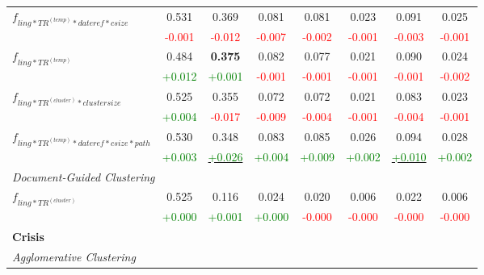 \documentclass[a4paper,BCOR=10mm]{report}
\numberwithin{lemma}{chapter}
\numberwithin{definition}{chapter}
\begin{document}
\begin{table}
\begin{centering}
{\begin{tabular}{|l|ccccccc|}
\multirow{2}{*}{$f_{ ling*TR^{(temp)}*\mathit{dateref}*\mathit{csize} }$}   & 0.531 & 0.369 & 0.081 & 0.081 & 0.023 & 0.091 & 0.025 \\
    & \small \textcolor{red}{-0.001}    & \small \textcolor{red}{-0.012}    & \small \textcolor{red}{-0.007}    & \small \textcolor{red}{-0.002}    & \small \textcolor{red}{-0.001}    & \small \textcolor{red}{-0.003}    & \small \textcolor{red}{-0.001} \\\hline
\multirow{2}{*}{$f_{ ling*TR^{(temp)} }$}   & 0.484 & \textbf{ 0.375 }  & 0.082 & 0.077 & 0.021 & 0.090 & 0.024 \\
    & \small \textcolor{green}{+0.012}  & \small \textcolor{green}{+0.001}  & \small \textcolor{red}{-0.001}    & \small \textcolor{red}{-0.001}    & \small \textcolor{red}{-0.001}    & \small \textcolor{red}{-0.001}    & \small \textcolor{red}{-0.002} \\\hline
\multirow{2}{*}{$f_{ \mathit{ling}*TR^{(cluster)}*\mathit{cluster size} }$} & 0.525 & 0.355 & 0.072 & 0.072 & 0.021 & 0.083 & 0.023 \\
    & \small \textcolor{green}{+0.004}  & \small \textcolor{red}{-0.017}    & \small \textcolor{red}{-0.009}    & \small \textcolor{red}{-0.004}    & \small \textcolor{red}{-0.001}    & \small \textcolor{red}{-0.004}    & \small \textcolor{red}{-0.001} \\\hline
\multirow{2}{*}{$f_{ ling*TR^{(temp)}*\mathit{dateref}*\mathit{csize}*\mathit{path} }$}   & 0.530 & 0.348 & 0.083 & 0.085 & 0.026 & 0.094 & 0.028 \\
    & \small \textcolor{green}{+0.003}  & \underline{\small \textcolor{green}{+0.026}}  & \small \textcolor{green}{+0.004}  & \small \textcolor{green}{+0.009}  & \small \textcolor{green}{+0.002}  & \underline{\small \textcolor{green}{+0.010}}  & \small \textcolor{green}{+0.002} \\\hline
\multicolumn{ 8 }{|l|}{ \textit{ Document-Guided Clustering } }\\\hline
\multirow{2}{*}{$f_{ \mathit{ling}*TR^{(cluster)} }$} & 0.525 & 0.116 & 0.024 & 0.020 & 0.006 & 0.022 & 0.006 \\
    & \small \textcolor{green}{+0.000}  & \small \textcolor{green}{+0.001}  & \small \textcolor{green}{+0.000}  & \small \textcolor{red}{-0.000}    & \small \textcolor{red}{-0.000}    & \small \textcolor{red}{-0.000}    & \small \textcolor{red}{-0.000} \\\hline
\multicolumn{ 8 }{|l|}{ \textbf{ Crisis } }\\\hline
\multicolumn{ 8 }{|l|}{ \textit{ Agglomerative Clustering } }\\\hline

\end{tabular}}
\end{centering}
\end{table}
\end{document}
